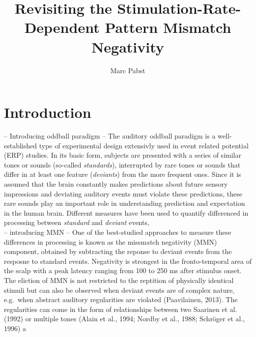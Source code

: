 \documentclass[stu,a4paper,12pt, nofontenc, babel, american]{apa7}
\title{Revisiting the Stimulation-Rate-Dependent Pattern Mismatch
Negativity}
\author{Marc Pabst}
\date{}
\begin{document}
\maketitle


\renewcommand*\contentsname{}

\setcounter{tocdepth}{3}
\tableofcontents

\newpage

\hypertarget{introduction}{%
\section{Introduction}\label{introduction}}

-- Introducing oddball paradigm -- The auditory oddball paradigm is a
well-established type of experimental design extensivly used in event
related potential (ERP) studies. In its basic form, subjects are
presented with a series of similar tones or sounds (so-called
\emph{standards}), interrupted by rare tones or sounds that differ in at
least one feature (\emph{deviants}) from the more frequent ones. Since
it is assumed that the brain constantly makes predictions about future
sensory impressions and deviating auditory events must violate these
predictions, these rare sounds play an important role in understanding
prediction and expectation in the human brain. Different measures have
been used to quantify differenced in processing between \emph{standard}
and \emph{deviant} events,\\
-- introducing MMN -- One of the best-studied approaches to measure
these differences in processing is known as the missmatch negativity
(MMN) component, obtained by subtracting the reponse to deviant events
from the resposne to standard events. Negativity is strongest in the
fronto-temporal area of the scalp with a peak latency ranging from 100
to 250 ms after stimulus onset. The eliction of MMN is not restricted to
the reptition of physically identical stimuli but can also be observed
when deviant events are of complex nature, e.g.~when abstract auditory
regularities are violated (Paavilainen, 2013). The regularities can come
in the form of relationships between two Saarinen et al. (1992) or
multiple tones (Alain et al., 1994; Nordby et al., 1988; Schröger et
al., 1996) a
\end{document}

